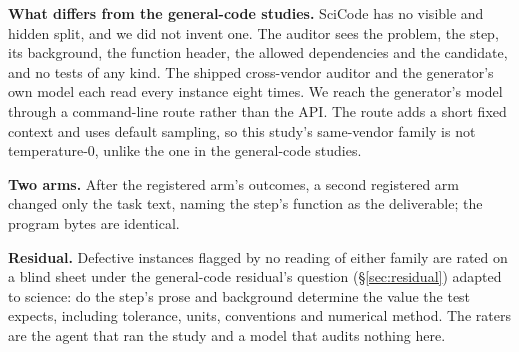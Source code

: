 \textbf{What differs from the general-code studies.} SciCode has no visible and hidden split, and we did not invent
one. The auditor sees the problem, the step, its background, the function header, the allowed
dependencies and the candidate, and no tests of any kind. The shipped cross-vendor auditor and the
generator's own model each read every instance eight times. We reach the generator's model
through a command-line route rather than the API. The route adds a short fixed context and uses
default sampling, so this study's same-vendor family is not temperature-0, unlike the one in the
general-code studies.

\textbf{Two arms.} After the registered arm's outcomes, a second registered arm changed only the
task text, naming the step's function as the deliverable; the program bytes are identical.

\textbf{Residual.} Defective instances flagged by no reading of either family are rated on a
blind sheet under the general-code residual's question (\S\ref{sec:residual}) adapted to science: do the step's prose and background
determine the value the test expects, including tolerance, units, conventions and numerical
method. The raters are the agent that ran the study and a model that audits nothing here.

